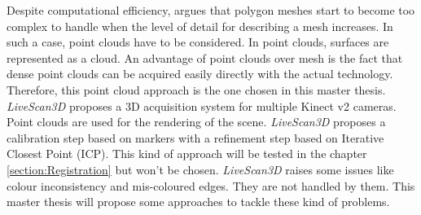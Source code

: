 Despite computational efficiency, \cite{smolic_state---art_nodate} argues that polygon meshes start to become too complex to handle when the level of detail for describing a mesh increases. In such a case, point clouds have to be considered. In point clouds, surfaces are represented as a cloud. An advantage of point clouds over mesh is the fact that dense point clouds can be acquired easily directly with the actual technology. Therefore, this point cloud approach is the one chosen in this master thesis. \textit{LiveScan3D} \cite{kowalski_livescan3d:_2015} proposes a 3D acquisition system for multiple Kinect v2 cameras. Point clouds are used for the rendering of the scene. \textit{LiveScan3D} proposes a calibration step based on markers with a refinement step based on Iterative Closest Point (ICP). This kind of approach will be tested in the chapter \ref{section:Registration} but won't be chosen. \textit{LiveScan3D} raises some issues like colour inconsistency and mis-coloured edges. They are not handled by them. This master thesis will propose some approaches to tackle these kind of problems.